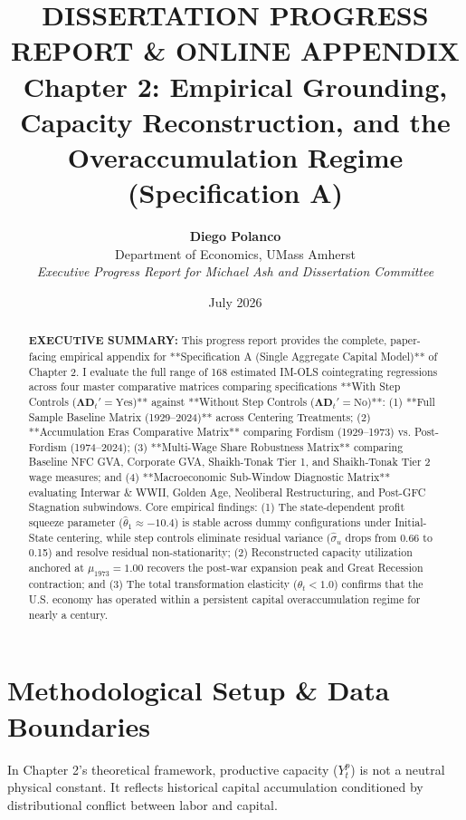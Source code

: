 \documentclass[11pt,a4paper]{article}
\title{\textbf{DISSERTATION PROGRESS REPORT \& ONLINE APPENDIX} \\[0.5em] \Large \textbf{Chapter 2: Empirical Grounding, Capacity Reconstruction, and the Overaccumulation Regime (Specification A)}}
\author{\textbf{Diego Polanco} \\ Department of Economics, UMass Amherst \\ \textit{Executive Progress Report for Michael Ash and Dissertation Committee}}
\date{July 2026}
\begin{document}
\maketitle

\begin{abstract}
\noindent \textbf{EXECUTIVE SUMMARY:} This progress report provides the complete, paper-facing empirical appendix for **Specification A (Single Aggregate Capital Model)** of Chapter 2. I evaluate the full range of 168 estimated IM-OLS cointegrating regressions across four master comparative matrices comparing specifications **With Step Controls ($\boldsymbol{\Lambda}\mathbf{D}_t' = \text{Yes}$)** against **Without Step Controls ($\boldsymbol{\Lambda}\mathbf{D}_t' = \text{No}$)**: (1) **Full Sample Baseline Matrix (1929--2024)** across Centering Treatments; (2) **Accumulation Eras Comparative Matrix** comparing Fordism (1929--1973) vs. Post-Fordism (1974--2024); (3) **Multi-Wage Share Robustness Matrix** comparing Baseline NFC GVA, Corporate GVA, Shaikh-Tonak Tier 1, and Shaikh-Tonak Tier 2 wage measures; and (4) **Macroeconomic Sub-Window Diagnostic Matrix** evaluating Interwar \& WWII, Golden Age, Neoliberal Restructuring, and Post-GFC Stagnation subwindows. Core empirical findings: (1) The state-dependent profit squeeze parameter ($\hat{\theta}_1 \approx -10.4$) is stable across dummy configurations under Initial-State centering, while step controls eliminate residual variance ($\hat{\sigma}_u$ drops from 0.66 to 0.15) and resolve residual non-stationarity; (2) Reconstructed capacity utilization anchored at $\mu_{1973} = 1.00$ recovers the post-war expansion peak and Great Recession contraction; and (3) The total transformation elasticity ($\theta_t < 1.0$) confirms that the U.S. economy has operated within a persistent capital overaccumulation regime for nearly a century.
\end{abstract}

\FloatBarrier
\section{Methodological Setup \& Data Boundaries}

In Chapter 2's theoretical framework, productive capacity ($Y^p_t$) is not a neutral physical constant. It reflects historical capital accumulation conditioned by distributional conflict between labor and capital.
\end{document}
